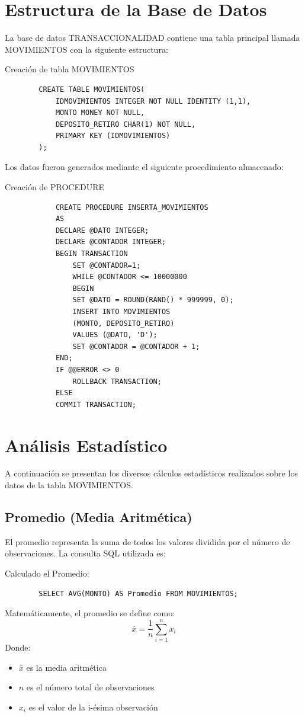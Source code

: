 \section{Estructura de la Base de Datos}
La base de datos TRANSACCIONALIDAD contiene una tabla principal llamada MOVIMIENTOS con la siguiente estructura:
\begin{comando}	{Creación de tabla MOVIMIENTOS}
	\begin{verbatim}
		CREATE TABLE MOVIMIENTOS(
			IDMOVIMIENTOS INTEGER NOT NULL IDENTITY (1,1),
			MONTO MONEY NOT NULL,
			DEPOSITO_RETIRO CHAR(1) NOT NULL,
			PRIMARY KEY (IDMOVIMIENTOS)
		);
	\end{verbatim}	
\end{comando}
Los datos fueron generados mediante el siguiente procedimiento almacenado:
\begin{comando}	{Creación de PROCEDURE}
	\begin{verbatim}
			CREATE PROCEDURE INSERTA_MOVIMIENTOS
			AS
			DECLARE @DATO INTEGER;
			DECLARE @CONTADOR INTEGER;
			BEGIN TRANSACTION
				SET @CONTADOR=1;
				WHILE @CONTADOR <= 10000000
				BEGIN
				SET @DATO = ROUND(RAND() * 999999, 0);
				INSERT INTO MOVIMIENTOS
				(MONTO, DEPOSITO_RETIRO)
				VALUES (@DATO, 'D');
				SET @CONTADOR = @CONTADOR + 1;
			END;
			IF @@ERROR <> 0
				ROLLBACK TRANSACTION;
			ELSE
			COMMIT TRANSACTION;
	\end{verbatim}	
\end{comando}
\section{Análisis Estadístico}
A continuación se presentan los diversos cálculos estadísticos realizados sobre los datos de la tabla MOVIMIENTOS.
\subsection{Promedio (Media Aritmética)}
El promedio representa la suma de todos los valores dividida por el número de observaciones. La consulta SQL utilizada es:
\begin{comando} {Calculado el Promedio:}
	\begin{verbatim}
		SELECT AVG(MONTO) AS Promedio FROM MOVIMIENTOS;
	\end{verbatim}
\end{comando}
Matemáticamente, el promedio se define como:
\begin{equation}
	\bar{x} = \frac{1}{n}\sum_{i=1}^{n}x_i
\end{equation}
Donde:
\begin{itemize}
	\item $\bar{x}$ es la media aritmética
	\item $n$ es el número total de observaciones
	\item $x_i$ es el valor de la i-ésima observación
\end{itemize}
